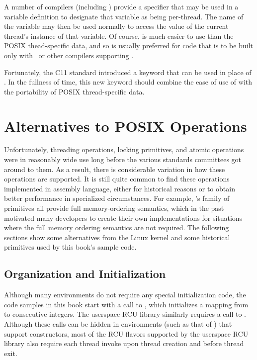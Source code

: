A number of compilers (including \GCC) provide a  specifier
that may be used in a variable definition to designate that variable
as being per-thread.
The name of the variable may then be used normally to access the
value of the current thread's instance of that variable.
Of course,  is much easier to use than the POSIX
thead-specific data, and so  is usually preferred for
code that is to be built only with \GCC\ or other compilers supporting
.

Fortunately, the C11 standard introduced a  keyword
that can be used in place of .
In the fullness of time, this new keyword should combine the ease of use
of  with the portability of POSIX thread-specific data.

\section{Alternatives to POSIX Operations}
\label{sec:toolsoftrade:Alternatives to POSIX Operations}

Unfortunately, threading operations, locking primitives, and atomic
operations were in reasonably wide use long before the various standards
committees got around to them.
As a result, there is considerable variation in how these operations
are supported.
It is still quite common to find these operations implemented in
assembly language, either for historical reasons or to obtain better
performance in specialized circumstances.
For example, \GCC's  family of primitives all provide full
memory-ordering semantics, which in the past motivated many developers
to create their own implementations for situations where the full memory
ordering semantics are not required.
The following sections show some alternatives from the Linux kernel
and some historical primitives used by this book's sample code.

\subsection{Organization and Initialization}
\label{sec:toolsoftrade:Organization and Initialization}

Although many environments do not require any special initialization
code, the code samples in this book start with a call to ,
which initializes a mapping from  to consecutive integers.
The userspace RCU library similarly requires a call to .
Although these calls can be hidden in environments (such as that of
\GCC) that support constructors,
most of the RCU flavors supported by the userspace RCU library
also require each thread invoke  upon thread
creation and  before thread exit.

